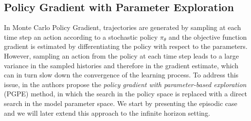 \subsection{Policy Gradient with Parameter Exploration}
In Monte Carlo Policy Gradient, trajectories are generated by sampling at each
time step an action according to a stochastic policy $\pi_\theta$ and the
objective function gradient is estimated by differentiating the policy with
respect to the parameters. However, sampling an action from the policy at each
time step leads to a large variance in the sampled histories and therefore in 
the gradient estimate, which can in turn slow down the convergence of the
learning process. To address this issue, in \cite{sehnke2008policy} the authors
propose the \emph{policy gradient with parameter-based exploration} (PGPE)
method, in which the search in the policy space is replaced with a direct
search in the model parameter space. We start by presenting the episodic case
and we will later extend this approach to the infinite horizon setting.  

